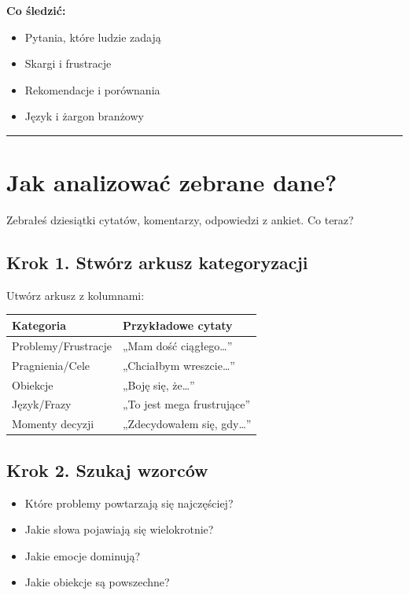 \documentclass[
  12pt,
  a4paper,
  twoside,
  openright,
  12pt,
  DIV=12,
  BCOR=12mm]{scrbook}
\providecommand{\tightlist}{%
  \setlength{\itemsep}{0pt}\setlength{\parskip}{0pt}}\usepackage{longtable,booktabs,array}
\newcommand{\decoline}{%
  \begin{center}
    \textcolor{bordergray}{\rule{0.3\textwidth}{0.5pt}}
  \end{center}
}
\begin{document}
\textbf{Co śledzić:}

\begin{itemize}
\tightlist
\item
  Pytania, które ludzie zadają
\item
  Skargi i frustracje
\item
  Rekomendacje i porównania
\item
  Język i żargon branżowy
\end{itemize}

\decoline

\section{Jak analizować zebrane
dane?}\label{jak-analizowaux107-zebrane-dane}

Zebrałeś dziesiątki cytatów, komentarzy, odpowiedzi z ankiet. Co teraz?

\subsection{Krok 1. Stwórz arkusz
kategoryzacji}\label{krok-1.-stwuxf3rz-arkusz-kategoryzacji}

Utwórz arkusz z kolumnami:

\begin{longtable}[]{@{}ll@{}}
\toprule\noalign{}
Kategoria & Przykładowe cytaty \\
\midrule\noalign{}
\endhead
\bottomrule\noalign{}
\endlastfoot
Problemy/Frustracje & „Mam dość ciągłego\ldots'' \\
Pragnienia/Cele & „Chciałbym wreszcie\ldots'' \\
Obiekcje & „Boję się, że\ldots'' \\
Język/Frazy & „To jest mega frustrujące'' \\
Momenty decyzji & „Zdecydowałem się, gdy\ldots'' \\
\end{longtable}

\subsection{Krok 2. Szukaj wzorców}\label{krok-2.-szukaj-wzorcuxf3w}

\begin{itemize}
\tightlist
\item
  Które problemy powtarzają się najczęściej?
\item
  Jakie słowa pojawiają się wielokrotnie?
\item
  Jakie emocje dominują?
\item
  Jakie obiekcje są powszechne?
\end{itemize}
\end{document}
